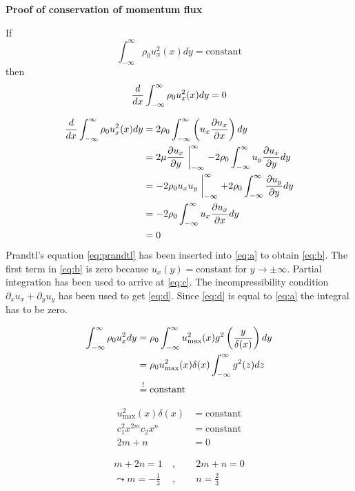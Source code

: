 \begin{framed}
\textbf{Proof of conservation of momentum flux}

If
\begin{equation}
\int_{-\infty}^\infty \rho_0u_x^2(x)dy=\mathrm{constant}
\end{equation}
then
\begin{equation}
\frac{d }{d x}\int_{-\infty}^\infty \rho_0u_x^2(x)dy=0
\end{equation}

\begin{align}
\frac{d }{d x}\int_{-\infty}^\infty \rho_0u_x^2(x)dy &= 2\rho_0\int_{-\infty}^\infty\left(u_x\frac{\partial u_x}{\partial x}\right)dy \label{eq:a}\\
&= 2\mu\frac{\partial u_x}{\partial y}\biggm\vert_{-\infty}^\infty-2\rho_0\int_{-\infty}^\infty u_y\frac{\partial u_x}{\partial y}dy \label{eq:b}\\
&=-2\rho_0u_xu_y\biggm\vert_{-\infty}^\infty + 2\rho_0 \int_{-\infty}^\infty\frac{\partial u_y}{\partial y}dy \label{eq:c}\\
&= -2\rho_0\int_{-\infty}^\infty u_x\frac{\partial u_x}{\partial x}dy \label{eq:d}\\
&= 0
\end{align}
Prandtl's equation \eqref{eq:prandtl} has been inserted into \eqref{eq:a} to obtain \eqref{eq:b}. The first term in \eqref{eq:b} is zero because $u_x(y)=\text{constant}$ for $y\rightarrow\pm\infty$. Partial integration has been used to arrive at \eqref{eq:c}. The incompressibility condition $\partial_xu_x+\partial_yu_y$ has been used to get \eqref{eq:d}. Since \eqref{eq:d} is equal to \eqref{eq:a} the integral has to be zero.
\end{framed}

\begin{align}
\int_{-\infty}^\infty\rho_0u_x^2dy &= \rho_0\int_{-\infty}^\infty u_\mathrm{max}^2(x)g^2\left(\frac{y}{\delta(x)}\right)dy\\
&= \rho_0u_\mathrm{max}^2(x)\delta(x)\int_{-\infty}^\infty g^2(z)dz\\
&\overset{!}{=} \mathrm{constant}
\end{align}

\begin{align}
u_\mathrm{max}^2(x)\delta(x)&=\mathrm{constant}\\
c_1^2x^{2m}c_2x^n &= \mathrm{constant}\\
2m+n &= 0
\end{align}

\begin{align}
m+2n=1\ &,\qquad 2m+n=0 \\
\leadsto
m=-\frac{1}{3}\ &,\qquad n=\frac{2}{3}
\end{align}

